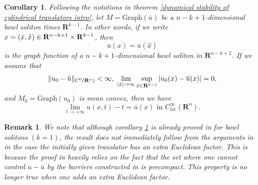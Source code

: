\documentclass[pdflatex,sn-mathphys-num]{sn-jnl}%
\newtheorem{corollary}[theorem]{Corollary}
\newtheorem{remark}[theorem]{Remark}
\begin{document}
\begin{corollary}\label{strong convergence to bowl with strong asymptotic behavior}
Following the notations in theorem \ref{dynamical stability of cylindrical translators intro}, let $\overline{M} = \text{Graph}(\overline{u})$ be a $n-k+1$-dimensional bowl soliton times $\mathbf{R}^{k-1}$. In other words, if we write $x = ( \hat{x},\Tilde{x}) \in \mathbf{R}^{n-k+1}\times \mathbf{R}^{k-1}$, then \begin{equation}
    \overline{u}(x) = \overline{u}(\hat{x})
\end{equation}    
is the graph function of a $n-k+1$-dimensional bowl soliton in $\mathbf{R}^{n-k+2}$. If we assume that
\begin{equation}\label{strongasymptoticbehaviorassumption}
   \|u_0 - \hat{u}\|_{C^0(\mathbf{R}^n)} < \infty, \ \lim_{|\hat{x}| \to \infty}\sup_{\Tilde{x}\in \mathbf{R}^{k-1}}|u_0(x) - \overline{u}(x)| = 0, 
\end{equation}
and $M_0 = \text{Graph}(u_0)$ is mean convex, then we have 
\begin{equation}
    \lim_{t \to +\infty}u(x,t) - t = \overline{u}(x) \text{ in }C^{\infty}_{loc}(\mathbf{R}^n).
\end{equation}
\end{corollary}
\begin{remark}
     We note that although corollary \ref{strong convergence to bowl with strong asymptotic behavior} is already proved in \cite{bowlstability} for bowl solitons $(k = 1)$, the result does not immediately follow from the arguments in \cite{bowlstability} in the case the initially given translator has an extra Euclidean factor. This is because the proof in \cite{bowlstability} heavily relies on the fact that the set where one cannot control $u - \overline{u}$ by the barriers constructed in \cite{bowlstability} is precompact. This property is no longer true when one adds an extra Euclidean factor. 
\end{remark}
\end{document}
